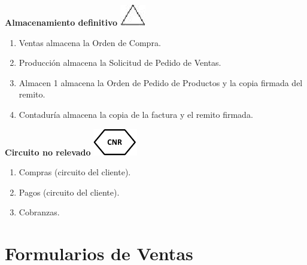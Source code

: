 \begin{center}
  \textbf{Almacenamiento definitivo}
  \includegraphics{./Images/Simbolos/simbolo-Almacenamiento-Definitivo.png}
\end{center}
\begin{enumerate}
  \item Ventas almacena la Orden de Compra.
  \item Producción almacena la Solicitud de Pedido de Ventas.
  \item Almacen 1 almacena la Orden de Pedido de Productos y la copia firmada del remito.
  \item Contaduría almacena la copia de la factura y el remito firmada.  
\end{enumerate}

\begin{center}
  \textbf{Circuito no relevado}
  \includegraphics{./Images/Simbolos/simbolo-CNR.png}
\end{center}
\begin{enumerate}
  \item Compras (circuito del cliente).
  \item Pagos (circuito del cliente).
  \item Cobranzas.
\end{enumerate}

\pagebreak
\section{Formularios de Ventas}

